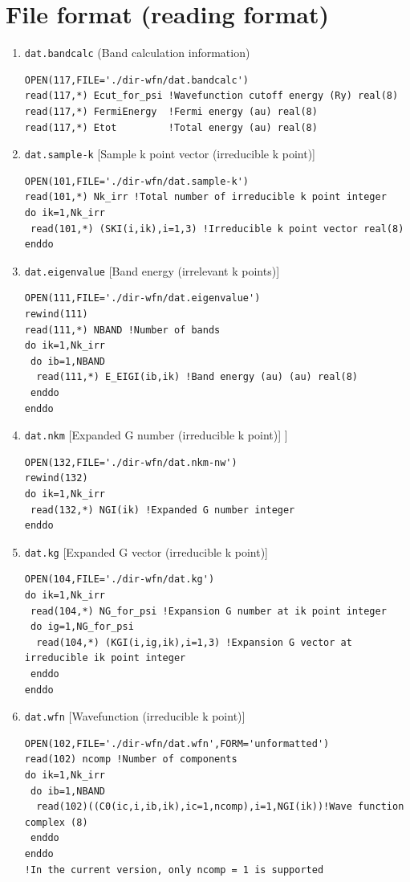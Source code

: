 \documentclass{article}
\begin{document}
\clearpage 

\section{\label{fileformat}File format (reading format)} 

\begin{enumerate}
\item \verb+dat.bandcalc+ (Band calculation information)
\begin{verbatim}
OPEN(117,FILE='./dir-wfn/dat.bandcalc') 
read(117,*) Ecut_for_psi !Wavefunction cutoff energy (Ry) real(8)
read(117,*) FermiEnergy  !Fermi energy (au) real(8)
read(117,*) Etot         !Total energy (au) real(8) 
\end{verbatim}
\item \verb+dat.sample-k+ [Sample k point vector (irreducible k point)] 
\begin{verbatim}
OPEN(101,FILE='./dir-wfn/dat.sample-k') 
read(101,*) Nk_irr !Total number of irreducible k point integer
do ik=1,Nk_irr 
 read(101,*) (SKI(i,ik),i=1,3) !Irreducible k point vector real(8)
enddo 
\end{verbatim}
\item \verb+dat.eigenvalue+ [Band energy (irrelevant k points)]
\begin{verbatim}
OPEN(111,FILE='./dir-wfn/dat.eigenvalue') 
rewind(111)
read(111,*) NBAND !Number of bands
do ik=1,Nk_irr 
 do ib=1,NBAND 
  read(111,*) E_EIGI(ib,ik) !Band energy (au) (au) real(8)
 enddo 
enddo      
\end{verbatim}
\item \verb+dat.nkm+ [Expanded G number (irreducible k point)]
]
\begin{verbatim}
OPEN(132,FILE='./dir-wfn/dat.nkm-nw') 
rewind(132)
do ik=1,Nk_irr 
 read(132,*) NGI(ik) !Expanded G number integer
enddo  
\end{verbatim}
\item \verb+dat.kg+ [Expanded G vector (irreducible k point)]
\begin{verbatim}
OPEN(104,FILE='./dir-wfn/dat.kg')
do ik=1,Nk_irr 
 read(104,*) NG_for_psi !Expansion G number at ik point integer
 do ig=1,NG_for_psi 
  read(104,*) (KGI(i,ig,ik),i=1,3) !Expansion G vector at irreducible ik point integer
 enddo 
enddo 
\end{verbatim}
 
\vspace{3cm}

\item \verb+dat.wfn+ [Wavefunction (irreducible k point)] 
\begin{verbatim}
OPEN(102,FILE='./dir-wfn/dat.wfn',FORM='unformatted') 
read(102) ncomp !Number of components
do ik=1,Nk_irr  
 do ib=1,NBAND
  read(102)((C0(ic,i,ib,ik),ic=1,ncomp),i=1,NGI(ik))!Wave function complex (8)
 enddo 
enddo
!In the current version, only ncomp = 1 is supported


\end{verbatim}
\end{enumerate}
\end{document}
